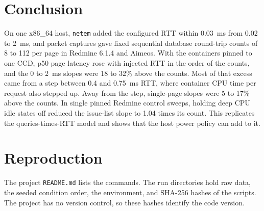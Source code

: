 \documentclass[11pt]{article}
\begin{document}
\section{Conclusion}

On one x86\_64 host, \texttt{netem} added the configured RTT within 0.03~ms from 0.02 to 2~ms,
and packet captures gave fixed sequential database round-trip counts of 8 to 112 per page in
Redmine 6.1.4 and Aimeos. With the containers pinned to one CCD, p50 page latency rose with
injected RTT in the order of the counts, and the 0 to 2~ms slopes were 18 to 32\% above the
counts. Most of that excess came from a step between 0.4 and 0.75~ms RTT, where container CPU
time per request also stepped up. Away from the step, single-page slopes were 5 to 17\% above
the counts. In single pinned Redmine control sweeps, holding deep CPU idle states off reduced
the issue-list slope to 1.04 times its count. This replicates the queries-times-RTT model and
shows that the host power policy can add to it.

\section{Reproduction}

The project \texttt{README.md} lists the commands. The run directories hold raw data, the
seeded condition order, the environment, and SHA-256 hashes of the scripts. The project has
no version control, so these hashes identify the code version.



\end{document}
